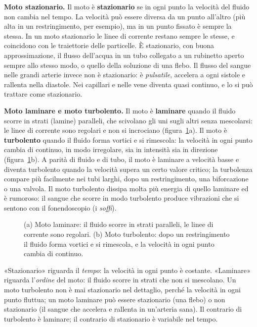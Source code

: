 \textbf{Moto stazionario.} Il moto è \textbf{stazionario} se in ogni punto la velocità del fluido non cambia nel tempo. La velocità può essere diversa da un punto all'altro (più alta in un restringimento, per esempio), ma in un punto fissato è sempre la stessa. In un moto stazionario le linee di corrente restano sempre le stesse, e coincidono con le traiettorie delle particelle. È stazionario, con buona approssimazione, il flusso dell'acqua in un tubo collegato a un rubinetto aperto sempre allo stesso modo, o quello della soluzione di una flebo. Il flusso del sangue nelle grandi arterie invece non è stazionario: è \emph{pulsatile}, accelera a ogni sistole e rallenta nella diastole. Nei capillari e nelle vene diventa quasi continuo, e lo si può trattare come stazionario.

\textbf{Moto laminare e moto turbolento.} Il moto è \textbf{laminare} quando il fluido scorre in strati (lamine) paralleli, che scivolano gli uni sugli altri senza mescolarsi: le linee di corrente sono regolari e non si incrociano (figura~\ref{fig:ud3-regimi}a). Il moto è \textbf{turbolento} quando il fluido forma vortici e si rimescola: la velocità in ogni punto cambia di continuo, in modo irregolare, sia in intensità sia in direzione (figura~\ref{fig:ud3-regimi}b). A parità di fluido e di tubo, il moto è laminare a velocità basse e diventa turbolento quando la velocità supera un certo valore critico; la turbolenza compare più facilmente nei tubi larghi, dopo un restringimento, una biforcazione o una valvola. Il moto turbolento dissipa molta più energia di quello laminare ed è rumoroso: il sangue che scorre in modo turbolento produce vibrazioni che si sentono con il fonendoscopio (i \emph{soffi}).

\begin{figure}[h]
\centering

\caption{(a) Moto laminare: il fluido scorre in strati paralleli, le linee di corrente sono regolari. (b) Moto turbolento: dopo un restringimento il fluido forma vortici e si rimescola, e la velocità in ogni punto cambia di continuo.}
\label{fig:ud3-regimi}
\end{figure}

\begin{attenzione}
«Stazionario» riguarda il \emph{tempo}: la velocità in ogni punto è costante. «Laminare» riguarda l'\emph{ordine} del moto: il fluido scorre in strati che non si mescolano. Un moto turbolento non è mai stazionario nel dettaglio, perché la velocità in ogni punto fluttua; un moto laminare può essere stazionario (una flebo) o non stazionario (il sangue che accelera e rallenta in un'arteria sana). Il contrario di turbolento è laminare; il contrario di stazionario è variabile nel tempo.
\end{attenzione}

